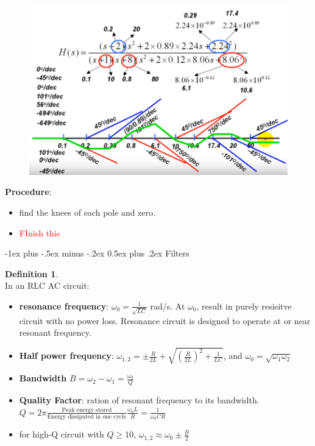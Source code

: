 \documentclass[10pt,landscape]{article}
\makeatletter
\renewcommand{\section}{\@startsection{section}{1}{0mm}%
                                {-1ex plus -.5ex minus -.2ex}%
                                {0.5ex plus .2ex}%
                                {\normalfont\large\bfseries}}
\newcommand\todo[1]{\textcolor{red}{#1}}
\theoremstyle{definition}
\newtheorem*{defin}{Definition}
\theoremstyle{remark}
\makeatother
\begin{document}
\begin{multicols}{3}
\begin{figure}[H]
    \centering
    \includegraphics[width=\linewidth]{202/figure/bode_2.png}
    \caption{}
    \label{fig:bode_2}
\end{figure}

\textbf{Procedure}: \\
\begin{itemize}[noitemsep,nolistsep]
    \item find the knees of each pole and zero. 
    \item \todo{FInish this}
\end{itemize}

\section{Filters}
\begin{defin} \mbox{} \\
In an RLC AC circuit:
\begin{itemize}[noitemsep,nolistsep]
    \item \textbf{resonance frequency}: $\omega_0 = \frac{1}{\sqrt{LC}}$ rad/s. At $\omega_0$, result in purely resisitve circuit with no power loss. Resonance circuit is designed to operate at or near resonant frequency. 
    \item \textbf{Half power frequency}: $\omega_{1,2} = \pm \frac{R}{2L} + \sqrt{(\frac{R}{2L})^2 + \frac{1}{LC}}$, and $\omega_0 = \sqrt{\omega_1\omega_2}$
    \item \textbf{Bandwidth} $B = \omega_2 - \omega_1 = \frac{\omega_0}{Q}$
    \item \textbf{Quality Factor}: ration of resonant frequency to its bandwidth. $Q = 2\pi \frac{\text{Peak energy stored}}{\text{Energy dissipated in one cycle}} \frac{\omega_0L}{R} = \frac{1}{\omega_0CR}$
    \item for high-Q circuit with $Q \geq 10$, $\omega_{1,2} \approx \omega_0 \pm \frac{B}{2}$
\end{itemize}
\end{defin}


\end{multicols}
\end{document}
